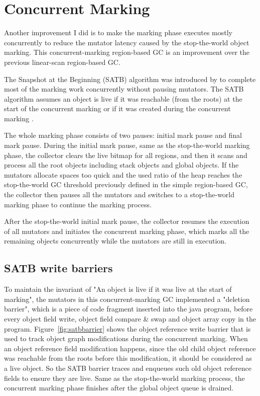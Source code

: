 \section{Concurrent Marking}
\label{sec:concmarkgc}

Another improvement I did is to make the marking phase executes mostly concurrently to reduce the
mutator latency caused by the stop-the-world object marking.
This concurrent-marking region-based GC is an improvement over the previous linear-scan region-based GC.

The Snapshot at the Beginning (SATB) algorithm was introduced by \cite{yuasa1990real} to
complete most of the marking work concurrently without pausing mutators. The SATB algorithm assumes an object is live if it was reachable (from the roots)
at the start of the concurrent marking or if it was created during the concurrent marking \cite{yuasa1990real}.

The whole marking phase consists of two pauses: initial mark pause and final mark pause.
During the initial mark pause, same as the stop-the-world marking phase,
the collector clears the live bitmap for all regions,
and then it scans and process all the root objects including stack objects and global objects.
If the mutators allocate spaces too quick and the used ratio of the heap reaches
the stop-the-world GC threshold previously defined in the simple region-based GC, the
collector then pauses all the mutators and switches to a stop-the-world marking phase
to continue the marking process.

After the stop-the-world initial mark pause, the collector resumes the execution of all mutators and
initiates the concurrent marking phase, which marks all the remaining objects concurrently
while the mutators are still in execution.

\subsection{SATB write barriers}

To maintain the invariant of "An object is live if it was live at the start of marking",
the mutators in this concurrent-marking GC implemented a "deletion barrier", which is a piece of code
fragment inserted into the java program, before every object field write, object field compare \& swap
and object array copy in the program. Figure~\ref{fig:satbbarrier} shows the object reference write barrier that is used
to track object graph modifications during the concurrent marking.
When an object reference field modification happens, since the old child object reference
was reachable from the roots before this modification, it should be considered as a live object.
So the SATB barrier traces and enqueues such old object reference fields to ensure they are live.
Same as the stop-the-world marking process, the concurrent marking phase finishes after
the global object queue is drained.

